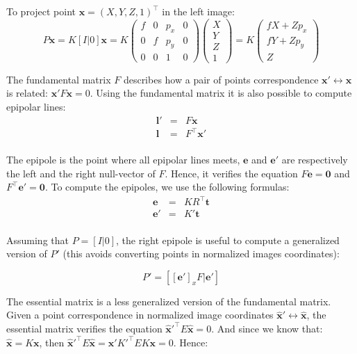 \documentclass[12pt]{article}
\begin{document}
To project point $\mathbf{x} = (X, Y, Z, 1)^\top$ in the left image:
\[
P\mathbf{x} = K[I|0]\mathbf{x} =  K
\left (
\begin{matrix}
	f & 0 & p_x & 0\\
	0 & f & p_y & 0\\
	0 & 0 & 1   & 0
\end{matrix}
\right )
\left (
\begin{matrix}
	X \\
	Y \\
	Z \\
	1
\end{matrix}
\right )
= K
\left (
\begin{matrix}
	fX + Zp_x \\
	fY + Zp_y \\
	Z
\end{matrix}
\right )
\]

The fundamental matrix $F$ describes how a pair of points correspondence $\mathbf{x}' \leftrightarrow \mathbf{x}$ is related: $\mathbf{x}'F\mathbf{x} = 0$. Using the fundamental matrix it is also possible to compute epipolar lines:
\[
  \begin{array}{lcl}
        \mathbf{l}' & = & F\mathbf{x} \\
        \mathbf{l} & = & F^\top\mathbf{x}' \\
  \end{array}
\]

The epipole is the point where all epipolar lines meets, $\mathbf{e}$ and $\mathbf{e}'$ are respectively the left and the right null-vector of $F$. Hence, it verifies the equation $F\mathbf{e} = \mathbf{0}$ and $F^\top\mathbf{e}' = \mathbf{0}$. To compute the epipoles, we use the following formulas:
\[
  \begin{array}{lcl}
        \mathbf{e} & = & KR^\top \mathbf{t} \\
        \mathbf{e}' & = & K'\mathbf{t} \\
  \end{array}
\]

Assuming that $P=[I|0]$, the right epipole is useful to compute a generalized version of $P'$ (this avoids converting points in normalized images coordinates):

\[
    P' = [[\mathbf{e}']_xF|\mathbf{e}']
\]

The essential matrix is a less generalized version of the fundamental matrix. Given a point correspondence in normalized image coordinates $\hat{\mathbf{x}}' \leftrightarrow \hat{\mathbf{x}}$, the essential matrix verifies the equation $\hat{\mathbf{x}}'^\top E\hat{\mathbf{x}} = 0$. And since we know that: $\hat{\mathbf{x}} = K\mathbf{x}$, then $\hat{\mathbf{x}}'^\top E\hat{\mathbf{x}} = \mathbf{x}'K'^\top EK\mathbf{x} = 0$. Hence:
\end{document}
